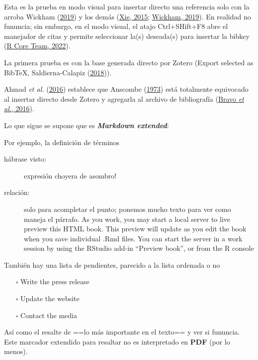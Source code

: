 \documentclass[
  12pt,
  twoside]{book}
\providecommand{\tightlist}{%
  \setlength{\itemsep}{0pt}\setlength{\parskip}{0pt}}
\theoremstyle{definition}
\theoremstyle{definition}
\theoremstyle{definition}
\theoremstyle{definition}
\theoremstyle{remark}
\begin{document}
Esta es la prueba en modo visual para insertar directo una referencia solo con la arroba Wickham (\protect\hyperlink{ref-wickham2019Advanced}{2019}) y los demás (\protect\hyperlink{ref-xie2015}{Xie, 2015}; \protect\hyperlink{ref-wickham2019Advanced}{Wickham, 2019}). En realidad no fununcia; sin embargo, en el modo visual, el atajo Ctrl+SHift+F8 abre el manejador de citas y permite seleccionar la(s) deseada(s) para insertar la bibkey (\protect\hyperlink{ref-R-base}{R Core Team, 2022}).

La primera prueba es con la base generada directo por Zotero (Export selected as BibTeX, Saldierna-Calapiz (\protect\hyperlink{ref-saldierna-calapiz2018Efectored}{2018})).

Ahmad \emph{et al.} (\protect\hyperlink{ref-ahmad2016UsingFisher}{2016}) establece que Anscombe (\protect\hyperlink{ref-anscombe1973GraphsStatistical}{1973}) está totalmente equivocado al insertar directo desde Zotero y agregarla al archivo de bibliografía (\protect\hyperlink{ref-bravo2016Teachinghigher}{Bravo \emph{et al.}, 2016}).

Lo que sigue se supone que es \textbf{\emph{Markdown extended}}:

Por ejemplo, la definición de términos

\begin{description}
\item[hábrase visto:]
expresión choyera de asombro!
\item[relación:]
solo para acompletar el punto; ponemos mucho texto para ver como maneja el párrafo. As you work, you may start a local server to live preview this HTML book. This preview will update as you edit the book when you save individual .Rmd files. You can start the server in a work session by using the RStudio add-in ``Preview book'', or from the R console
\end{description}

También hay una lista de pendientes, parecido a la lista ordenada o no

\begin{itemize}
\tightlist
\item[$\square$]
  Write the press release
\item[$\square$]
  Update the website
\item[$\square$]
  Contact the media
\end{itemize}

Así como el resalte de ==lo más importante en el texto== y ver si fununcia. Este marcador extendido para resaltar no es interpretado en \textbf{PDF} (por lo menos).
\end{document}
